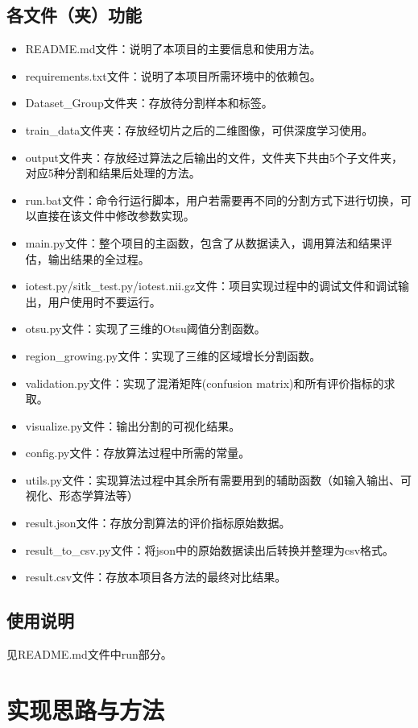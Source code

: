 \documentclass[UTF8]{ctexart}
\begin{document}
\subsection{各文件（夹）功能}
\begin{itemize}
    \item README.md文件：说明了本项目的主要信息和使用方法。
    \item requirements.txt文件：说明了本项目所需环境中的依赖包。
    \item Dataset\_Group文件夹：存放待分割样本和标签。
    \item train\_data文件夹：存放经切片之后的二维图像，可供深度学习使用。
    \item output文件夹：存放经过算法之后输出的文件，文件夹下共由5个子文件夹，对应5种分割和结果后处理的方法。
    \item run.bat文件：命令行运行脚本，用户若需要再不同的分割方式下进行切换，可以直接在该文件中修改参数实现。
    \item main.py文件：整个项目的主函数，包含了从数据读入，调用算法和结果评估，输出结果的全过程。
    \item iotest.py/sitk\_test.py/iotest.nii.gz文件：项目实现过程中的调试文件和调试输出，用户使用时不要运行。
    \item otsu.py文件：实现了三维的Otsu阈值分割函数。
    \item region\_growing.py文件：实现了三维的区域增长分割函数。
    \item validation.py文件：实现了混淆矩阵(confusion matrix)和所有评价指标的求取。
    \item visualize.py文件：输出分割的可视化结果。
    \item config.py文件：存放算法过程中所需的常量。
    \item utils.py文件：实现算法过程中其余所有需要用到的辅助函数（如输入输出、可视化、形态学算法等）
    \item result.json文件：存放分割算法的评价指标原始数据。
    \item result\_to\_csv.py文件：将json中的原始数据读出后转换并整理为csv格式。
    \item result.csv文件：存放本项目各方法的最终对比结果。
\end{itemize}

\subsection{使用说明}
见README.md文件中run部分。

\section{实现思路与方法}
\end{document}
